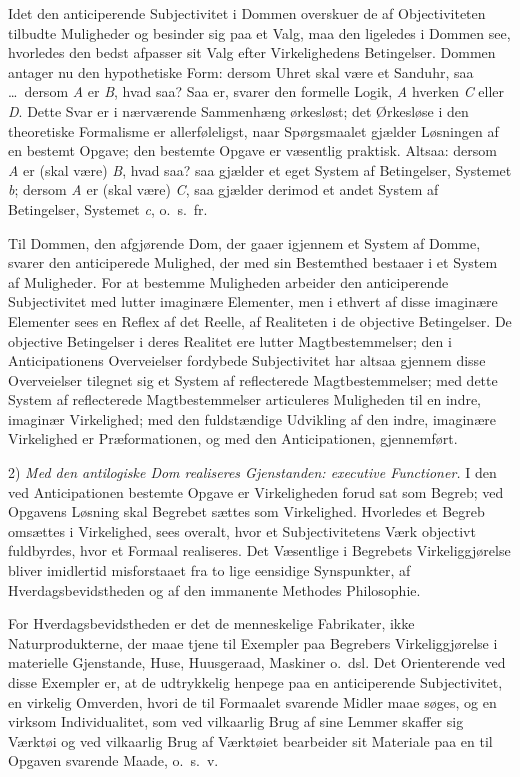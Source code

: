 \documentclass[12pt]{book}
\newcommand{\opage}[1]{\marginnote{\footnotesize\textit{[#1]}}}
\begin{document}
Idet den anticiperende Subjectivitet i Dommen overskuer
de af Objectiviteten tilbudte Muligheder og besinder sig paa
et Valg, maa den ligeledes i Dommen see, hvorledes den
bedst afpasser sit Valg efter Virkelighedens Betingelser.
Dommen antager nu den hypothetiske Form: dersom Uhret
skal være et Sanduhr, saa \dots\ dersom \textit{A} er \textit{B}, hvad saa?
Saa er, svarer den formelle Logik, \textit{A} hverken \textit{C} eller \textit{D}.
Dette Svar er i nærværende Sammenhæng ørkesløst; det
Ørkesløse i den theoretiske Formalisme er allerføleligst, naar
Spørgsmaalet gjælder Løsningen af en bestemt Opgave; den
bestemte Opgave er væsentlig praktisk. Altsaa: dersom \textit{A} er
(skal være) \textit{B}, hvad saa? saa gjælder et eget System af Betingelser,
Systemet \textit{b}; dersom \textit{A} er (skal være) \textit{C}, saa gjælder
derimod et andet System af Betingelser, Systemet \textit{c},
o.\ s.\ fr.

Til Dommen, den afgjørende Dom, der gaaer igjennem
et System af Domme, svarer den anticiperede Mulighed, der
\opage{128}med sin Bestemthed bestaaer i et System af Muligheder.
For at bestemme Muligheden arbeider den anticiperende
Subjectivitet med lutter imaginære Elementer, men i ethvert
af disse imaginære Elementer sees en Reflex af det Reelle,
af Realiteten i de objective Betingelser. De objective Betingelser
i deres Realitet ere lutter Magtbestemmelser; den i
Anticipationens Overveielser fordybede Subjectivitet har altsaa
gjennem disse Overveielser tilegnet sig et System af reflecterede
Magtbestemmelser; med dette System af reflecterede
Magtbestemmelser articuleres Muligheden til en indre,
imaginær Virkelighed; med den fuldstændige Udvikling af den
indre, imaginære Virkelighed er Præformationen, og med den
Anticipationen, gjennemført.

2) \emph{Med den antilogiske Dom realiseres Gjenstanden:
executive Functioner.} I den ved Anticipationen
bestemte Opgave er Virkeligheden forud sat som
Begreb; ved Opgavens Løsning skal Begrebet sættes som
Virkelighed. Hvorledes et Begreb omsættes i Virkelighed,
sees overalt, hvor et Subjectivitetens Værk objectivt fuldbyrdes,
hvor et Formaal realiseres. Det Væsentlige i Begrebets
Virkeliggjørelse bliver imidlertid misforstaaet fra to
lige eensidige Synspunkter, af Hverdagsbevidstheden og af den
immanente Methodes Philosophie.

For Hverdagsbevidstheden er det de menneskelige Fabrikater,
ikke Naturprodukterne, der maae tjene til Exempler paa
Begrebers Virkeliggjørelse i materielle Gjenstande, Huse,
Huusgeraad, Maskiner o.\ dsl. Det Orienterende ved disse
Exempler er, at de udtrykkelig henpege paa en anticiperende
Subjectivitet, en virkelig Omverden, hvori de til Formaalet
svarende Midler maae søges, og en virksom Individualitet, som
ved vilkaarlig Brug af sine Lemmer skaffer sig Værktøi og
ved vilkaarlig Brug af Værktøiet bearbeider sit Materiale
paa en til Opgaven svarende Maade, o.\ s.\ v.
\end{document}
